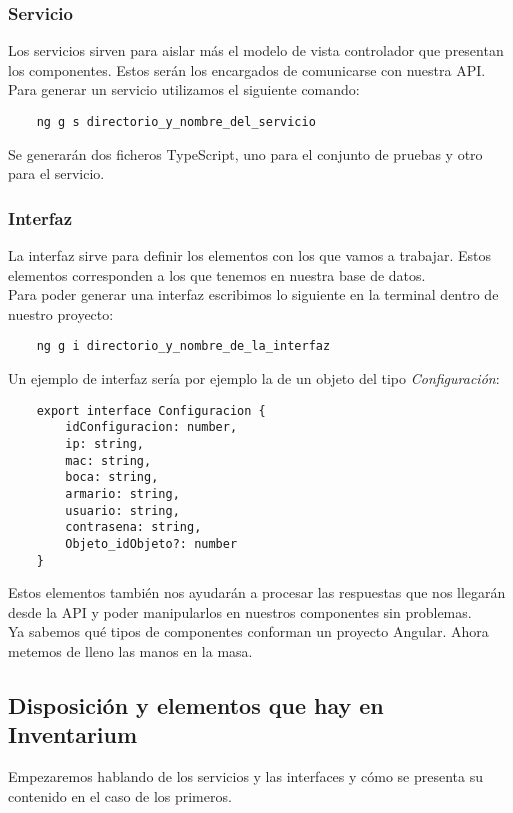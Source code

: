 \subsubsection{Servicio}
Los servicios sirven para aislar más el modelo de vista controlador que presentan los componentes. Estos serán los encargados de comunicarse con nuestra API.
\\Para generar un servicio utilizamos el siguiente comando:
\begin{verbatim}
    ng g s directorio_y_nombre_del_servicio
\end{verbatim}
Se generarán dos ficheros TypeScript, uno para el conjunto de pruebas y otro para el servicio.

\subsubsection{Interfaz}
La interfaz sirve para definir los elementos con los que vamos a trabajar. Estos elementos corresponden a los que tenemos en nuestra base de datos.
\\Para poder generar una interfaz escribimos lo siguiente en la terminal dentro de nuestro proyecto:
\begin{verbatim}
    ng g i directorio_y_nombre_de_la_interfaz
\end{verbatim}
Un ejemplo de interfaz sería por ejemplo la de un objeto del tipo \textit{Configuración}:
\begin{verbatim}
    export interface Configuracion {
        idConfiguracion: number,
        ip: string,
        mac: string,
        boca: string,
        armario: string,
        usuario: string,
        contrasena: string,
        Objeto_idObjeto?: number
    }
\end{verbatim}
Estos elementos también nos ayudarán a procesar las respuestas que nos llegarán desde la API y poder manipularlos en nuestros componentes sin problemas.
\vspace{\baselineskip}
\\Ya sabemos qué tipos de componentes conforman un proyecto Angular. Ahora metemos de lleno las manos en la masa.

\subsection{Disposición y elementos que hay en Inventarium}
Empezaremos hablando de los servicios y las interfaces y cómo se presenta su contenido en el caso de los primeros.

